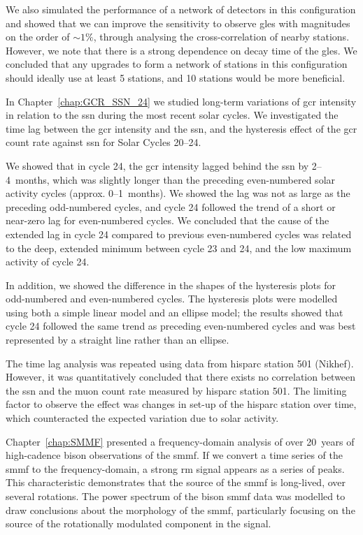 We also simulated the performance of a network of detectors in this configuration and showed that we can improve the sensitivity to observe \glspl{gle} with magnitudes on the order of $\sim 1 \%$, through analysing the cross-correlation of nearby stations. However, we note that there is a strong dependence on decay time of the \glspl{gle}. We concluded that any upgrades to form a network of stations in this configuration should ideally use at least 5 stations, and 10 stations would be more beneficial.


\vspace{2em}


In Chapter~\ref{chap:GCR_SSN_24} we studied long-term variations of \gls{gcr} intensity in relation to the \gls{ssn} during the most recent solar cycles. We investigated the time lag between the \gls{gcr} intensity and the \gls{ssn}, and the hysteresis effect of the \gls{gcr} count rate against \gls{ssn} for Solar Cycles 20--24.

We showed that in cycle 24, the \gls{gcr} intensity lagged behind the \gls{ssn} by 2--4~months, which was slightly longer than the preceding even-numbered solar activity cycles (approx. 0--1~months). We showed the lag was not as large as the preceding odd-numbered cycles, and cycle 24 followed the trend of a short or near-zero lag for even-numbered cycles. We concluded that the cause of the extended lag in cycle 24 compared to previous even-numbered cycles was related to the deep, extended minimum between cycle 23 and 24, and the low maximum activity of cycle 24.

In addition, we showed the difference in the shapes of the hysteresis plots for odd-numbered and even-numbered cycles. The hysteresis plots were modelled using both a simple linear model and an ellipse model; the results showed that cycle 24 followed the same trend as preceding even-numbered cycles and was best represented by a straight line rather than an ellipse.

The time lag analysis was repeated using data from \gls{hisparc} station 501 (Nikhef). However, it was quantitatively concluded that there exists no correlation between the \gls{ssn} and the muon count rate measured by \gls{hisparc} station 501. The limiting factor to observe the effect was changes in set-up of the \gls{hisparc} station over time, which counteracted the expected variation due to solar activity.


\vspace{2em}


Chapter~\ref{chap:SMMF} presented a frequency-domain analysis of over 20~years of high-cadence \gls{bison} observations of the \gls{smmf}. If we convert a time series of the \gls{smmf} to the frequency-domain, a strong \gls{rm} signal appears as a series of peaks. This characteristic demonstrates that the source of the \gls{smmf} is long-lived, over several rotations. The power spectrum of the \gls{bison} \gls{smmf} data was modelled to draw conclusions about the morphology of the \gls{smmf}, particularly focusing on the source of the rotationally modulated component in the signal.

